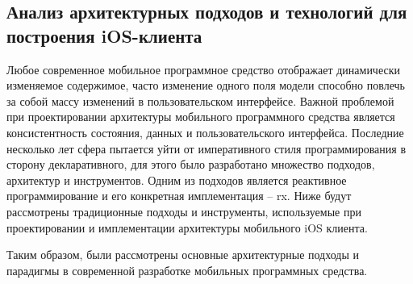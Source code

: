 \subsection{Анализ архитектурных подходов и технологий для построения iOS-клиента}
\label{sec:analysis:research:mobArch}

Любое современное мобильное программное средство отображает динамически изменяемое содержимое, часто изменение одного поля модели способно повлечь за собой массу изменений в пользовательском интерфейсе. Важной проблемой при проектировании архитектуры мобильного программного средства является консистентность состояния, данных и пользовательского интерфейса. Последние несколько лет сфера пытается уйти от императивного стиля программирования в сторону декларативного, для этого было разработано множество подходов, архитектур и инструментов. Одним из подходов является реактивное программирование и его конкретная имплементация -- \gls{rx}. Ниже будут рассмотрены традиционные подходы и инструменты, используемые при проектировании и имплементации архитектуры мобильного iOS клиента.








Таким образом, были рассмотрены основные архитектурные подходы и парадигмы в современной разработке мобильных программных средства.